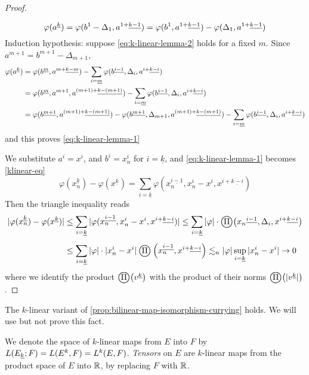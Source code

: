 \documentclass[../main-v2-manifolds.tex]{subfiles}
\begin{document}
\begin{proof}
\begin{note}
\[            \varphi(\UPL{a}[k]) = \varphi(b^1-\Delta_1, \UPL{a}[1+][k-1]) = \varphi(b^1, \UPL{a}[1+][k-1]) - \varphi(\Delta_1,\UPL{a}[1+][k-1])
        \]
        Induction hypothesis: suppose \cref{eq:k-linear-lemma-2} holds for a fixed $m$. Since $a^{m+1} = b^{m+1} - \Delta_{m+1}$, 
        \begin{align*}
            \varphi(\UPL{a}[k]) &= \varphi(\UPL{b}[m],\UPL{a}[m+][k-m]) - \sum_{i=\underline{m}}\varphi(\UPL{b}[i-1],\Delta_i,\UPL{a}[i+][k-i])\\
            &= \varphi(\UPL{b}[m],a^{m+1},\UPL{a}[(m+1)+][k-(m+1)]) - \sum_{i=\underline{m}}\varphi(\UPL{b}[i-1],\Delta_i,\UPL{a}[i+][k-i])\\
            &= \varphi(\UPL{b}[m+1],\UPL{a}[(m+1)+][k-(m+1)]) - \varphi(\UPL{b}[m+1],\Delta_{m+1},\UPL{a}[(m+1)+][k-(m+1)]) - \sum_{i=\underline{m}}\varphi(\UPL{b}[i-1],\Delta_i,\UPL{a}[i+][k-i])
        \end{align*}
        and this proves \cref{eq:k-linear-lemma-1}
    \end{note}
    We substitute $a^i = x^i$, and $b^i = x_n^i$ for $i = \underline{k}$, and \cref{eq:k-linear-lemma-1} becomes \cref{klinear-eq}
    \begin{equation}\label{klinear-eq}
        \varphi(x_n^{\underline{k}}) - \varphi(x^{\underline{k}}) = \sum_{i=\underline{k}}\varphi(x_n^{\underline{i-1}}, x_n^i - x^i, x^{i+\underline{k-i}})
    \end{equation}
    Then the triangle inequality reads
    \begin{align*}
        \abs{\varphi(x_n^{\underline{k}}) - \varphi(x^{\underline{k}})} &\leq \sum_{i=\underline{k}} \abs{\varphi(x_n^{\underline{i-1}}, x_n^i - x^i, x^{i+\underline{k-i}})}\leq \sum_{i=\underline{k}}\abs{\varphi}\cdot\bigoprod\qty({\UPL{x_n}[i-1],\Delta_i,\UPL{x}[i+][k-i]})\\[1ex]
        &\leq \sum_{i=\underline{k}}\abs{\varphi}\cdot\abs{x_n^i - x^i}\bigoprod\qty(x_n^{\underline{i-1}}, x^{i+\underline{k-i}})\Lsim_n\vert\varphi\vert\sup_{i=\underline{k}}\vert x_n^i - x^i\vert\to 0
    \end{align*}
    where we identify the product $\bigoprod\qty(\UPL{v}[k])$ with the product of their norms $\bigoprod \qty(\abs{\UPL{v}[k]})$. 
\end{proof}
\begin{remark}
    The $k$-linear variant of \cref{prop:bilinear-map-isomorphism-currying} holds. We will use but not prove this fact.
\end{remark}
\begin{remark}
We denote the space of $k$-linear maps from $E$ into $F$ by $L(\UL{E}[k]; F) = L(E^k, F) = L^k(E,F)$. \emph{Tensors} on $E$ are $k$-linear maps from the product space of $E$ into $\mathbb{R}$, by replacing $F$ with $\mathbb{R}$.
\end{remark}
%
%
\end{document}
